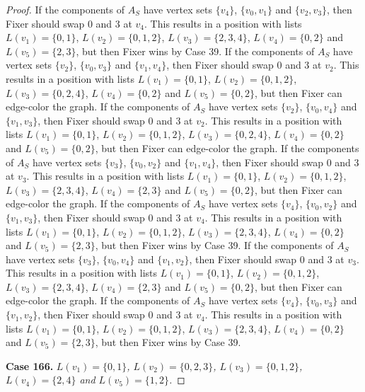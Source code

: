 \documentclass[12pt]{amsart}
\theoremstyle{plain}
\theoremstyle{definition}
\theoremstyle{remark}
\begin{document}
\begin{proof}
If the components of $A_S$ have vertex sets $\{v_4\}$, $\{v_0, v_1\}$ and $\{v_2, v_3\}$, then Fixer should swap 0 and 3 at $v_4$. This results in a position with lists $L(v_1) = \{0, 1\}$, $L(v_2) = \{0, 1, 2\}$, $L(v_3) = \{2, 3, 4\}$, $L(v_4) = \{0, 2\}$ and $L(v_5) = \{2, 3\}$, but then Fixer wins by Case 39.
If the components of $A_S$ have vertex sets $\{v_2\}$, $\{v_0, v_3\}$ and $\{v_1, v_4\}$, then Fixer should swap 0 and 3 at $v_2$. This results in a position with lists $L(v_1) = \{0, 1\}$, $L(v_2) = \{0, 1, 2\}$, $L(v_3) = \{0, 2, 4\}$, $L(v_4) = \{0, 2\}$ and $L(v_5) = \{0, 2\}$, but then Fixer can edge-color the graph.
If the components of $A_S$ have vertex sets $\{v_2\}$, $\{v_0, v_4\}$ and $\{v_1, v_3\}$, then Fixer should swap 0 and 3 at $v_2$. This results in a position with lists $L(v_1) = \{0, 1\}$, $L(v_2) = \{0, 1, 2\}$, $L(v_3) = \{0, 2, 4\}$, $L(v_4) = \{0, 2\}$ and $L(v_5) = \{0, 2\}$, but then Fixer can edge-color the graph.
If the components of $A_S$ have vertex sets $\{v_3\}$, $\{v_0, v_2\}$ and $\{v_1, v_4\}$, then Fixer should swap 0 and 3 at $v_3$. This results in a position with lists $L(v_1) = \{0, 1\}$, $L(v_2) = \{0, 1, 2\}$, $L(v_3) = \{2, 3, 4\}$, $L(v_4) = \{2, 3\}$ and $L(v_5) = \{0, 2\}$, but then Fixer can edge-color the graph.
If the components of $A_S$ have vertex sets $\{v_4\}$, $\{v_0, v_2\}$ and $\{v_1, v_3\}$, then Fixer should swap 0 and 3 at $v_4$. This results in a position with lists $L(v_1) = \{0, 1\}$, $L(v_2) = \{0, 1, 2\}$, $L(v_3) = \{2, 3, 4\}$, $L(v_4) = \{0, 2\}$ and $L(v_5) = \{2, 3\}$, but then Fixer wins by Case 39.
If the components of $A_S$ have vertex sets $\{v_3\}$, $\{v_0, v_4\}$ and $\{v_1, v_2\}$, then Fixer should swap 0 and 3 at $v_3$. This results in a position with lists $L(v_1) = \{0, 1\}$, $L(v_2) = \{0, 1, 2\}$, $L(v_3) = \{2, 3, 4\}$, $L(v_4) = \{2, 3\}$ and $L(v_5) = \{0, 2\}$, but then Fixer can edge-color the graph.
If the components of $A_S$ have vertex sets $\{v_4\}$, $\{v_0, v_3\}$ and $\{v_1, v_2\}$, then Fixer should swap 0 and 3 at $v_4$. This results in a position with lists $L(v_1) = \{0, 1\}$, $L(v_2) = \{0, 1, 2\}$, $L(v_3) = \{2, 3, 4\}$, $L(v_4) = \{0, 2\}$ and $L(v_5) = \{2, 3\}$, but then Fixer wins by Case 39.

\noindent\textbf{Case 166.  }\textit{$L(v_1) = \{0, 1\}$, $L(v_2) = \{0, 2, 3\}$, $L(v_3) = \{0, 1, 2\}$, $L(v_4) = \{2, 4\}$ and $L(v_5) = \{1, 2\}$.}


\end{proof}
\end{document}
